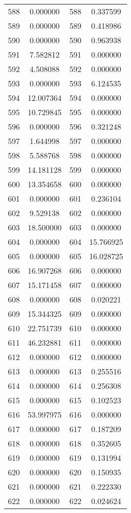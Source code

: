 \documentclass[12pt]{article}
\begin{document}
\begin{longtable}{@{}cccc@{}}
588 & 0.000000 & 588 & 0.337599 \\
589 & 0.000000 & 589 & 0.418986 \\
590 & 0.000000 & 590 & 0.963938 \\
591 & 7.582812 & 591 & 0.000000 \\
592 & 4.508088 & 592 & 0.000000 \\
593 & 0.000000 & 593 & 6.124535 \\
594 & 12.007364 & 594 & 0.000000 \\
595 & 10.729845 & 595 & 0.000000 \\
596 & 0.000000 & 596 & 0.321248 \\
597 & 1.644998 & 597 & 0.000000 \\
598 & 5.588768 & 598 & 0.000000 \\
599 & 14.181128 & 599 & 0.000000 \\
600 & 13.354658 & 600 & 0.000000 \\
601 & 0.000000 & 601 & 0.236104 \\
602 & 9.529138 & 602 & 0.000000 \\
603 & 18.500000 & 603 & 0.000000 \\
604 & 0.000000 & 604 & 15.766925 \\
605 & 0.000000 & 605 & 16.028725 \\
606 & 16.907268 & 606 & 0.000000 \\
607 & 15.171458 & 607 & 0.000000 \\
608 & 0.000000 & 608 & 0.020221 \\
609 & 15.344325 & 609 & 0.000000 \\
610 & 22.751739 & 610 & 0.000000 \\
611 & 46.232881 & 611 & 0.000000 \\
612 & 0.000000 & 612 & 0.000000 \\
613 & 0.000000 & 613 & 0.255516 \\
614 & 0.000000 & 614 & 0.256308 \\
615 & 0.000000 & 615 & 0.102523 \\
616 & 53.997975 & 616 & 0.000000 \\
617 & 0.000000 & 617 & 0.187209 \\
618 & 0.000000 & 618 & 0.352605 \\
619 & 0.000000 & 619 & 0.131994 \\
620 & 0.000000 & 620 & 0.150935 \\
621 & 0.000000 & 621 & 0.222330 \\
622 & 0.000000 & 622 & 0.024624 \\

\end{longtable}
\end{document}

